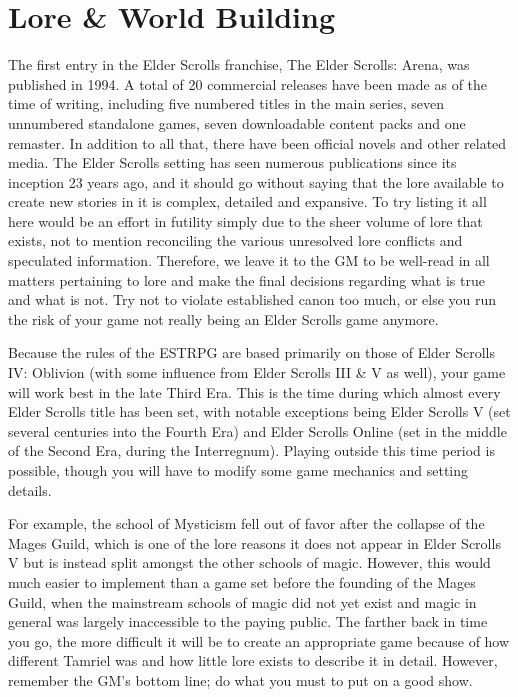 \documentclass[12pt]{book}
\begin{document}
\tableofcontents

\chapter{Lore \& World Building}
The first entry in the Elder Scrolls franchise, The Elder Scrolls: Arena, was published in 1994. A total of 20 commercial releases have been made as of the time of writing, including five numbered titles in the main series, seven unnumbered standalone games, seven downloadable content packs and one remaster. In addition to all that, there have been official novels and other related media. The Elder Scrolls setting has seen numerous publications since its inception 23 years ago, and it should go without saying that the lore available to create new stories in it is complex, detailed and expansive. To try listing it all here would be an effort in futility simply due to the sheer volume of lore that exists, not to mention reconciling the various unresolved lore conflicts and speculated information. Therefore, we leave it to the GM to be well-read in all matters pertaining to lore and make the final decisions regarding what is true and what is not. Try not to violate established canon too much, or else you run the risk of your game not really being an Elder Scrolls game anymore.

Because the rules of the ESTRPG are based primarily on those of Elder Scrolls IV: Oblivion (with some influence from Elder Scrolls III \& V as well), your game will work best in the late Third Era. This is the time during which almost every Elder Scrolls title has been set, with notable exceptions being Elder Scrolls V (set several centuries into the Fourth Era) and Elder Scrolls Online (set in the middle of the Second Era, during the Interregnum). Playing outside this time period is possible, though you will have to modify some game mechanics and setting details. 

For example, the school of Mysticism fell out of favor after the collapse of the Mages Guild, which is one of the lore reasons it does not appear in Elder Scrolls V but is instead split amongst the other schools of magic. However, this would much easier to implement than a game set before the founding of the Mages Guild, when the mainstream schools of magic did not yet exist and magic in general was largely inaccessible to the paying public. The farther back in time you go, the more difficult it will be to create an appropriate game because of how different Tamriel was and how little lore exists to describe it in detail. However, remember the GM's bottom line; do what you must to put on a good show.
\end{document}

